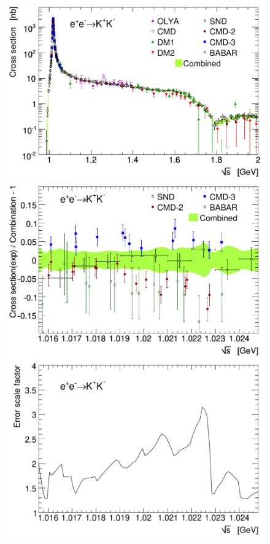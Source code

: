 \begin{figure}[p]
\includegraphics[width=\figsize]{Figures/combined_2pi_ePeM_to_phi_X__to_KPKM_X_log0,9-2,5GeV_dhmz19.pdf}
  \vspace{0.1cm}

\includegraphics[width=\figsize]{Figures/diffRel_channel_ePeM_to_phi_X__to_KPKM_X_dhmz19.pdf}\hspace{\fighspace}

  \vspace{0.1cm}
\includegraphics[width=\figsize]{Figures/Chi2Correction_combined_ePeM_to_phi_X__to_KPKM_X_dhmz19.pdf}
\vspace{-0.1cm}


\end{figure}
